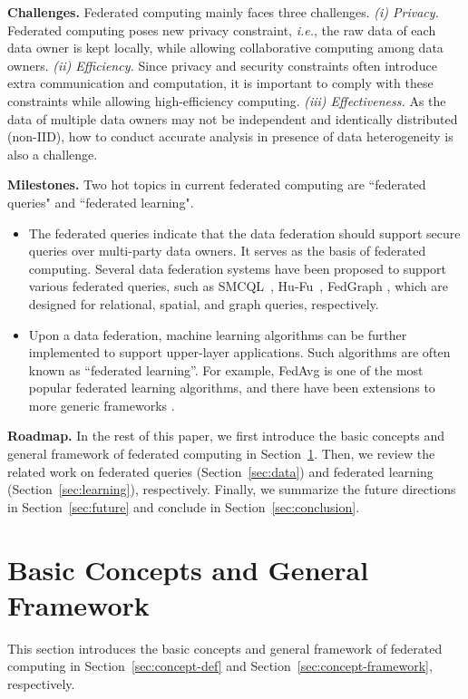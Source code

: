 \documentclass[11pt]{article}
\newcommand{\ie}{\textit{i.e.},\xspace}
\newcommand\secref[1]{Section~\ref{#1}}
\newcommand{\fakeparagraph}[1]{\vspace{1mm}\noindent\textbf{#1.}}
\begin{document}
\fakeparagraph{Challenges}
Federated computing mainly faces three challenges.
\textit{(i) Privacy.}
Federated computing poses new privacy constraint, \ie the raw data of each data owner is kept locally, while allowing collaborative computing among data owners.
\textit{(ii) Efficiency.}
Since privacy and security constraints often introduce extra communication and computation, it is important to comply with these constraints while allowing high-efficiency computing.
\textit{(iii) Effectiveness.}
As the data of multiple data owners may not be independent and identically distributed (non-IID), how to conduct accurate analysis in presence of data heterogeneity is also a challenge.

\fakeparagraph{Milestones}
Two hot topics in current federated computing are ``federated queries" and ``federated learning".
\begin{itemize}
    \item
    The federated queries indicate that the data federation should support secure queries over multi-party data owners.
    It serves as the basis of federated computing.
    Several data federation systems have been proposed to support various federated queries, such as \textsf{SMCQL}~\cite{Yongxin-ref_bater2017smcql}, \textsf{Hu-Fu}~\cite{Yongxin-ref_tong2022hu}, \textsf{FedGraph} \cite{Yongxin-DBLP:journals/pvldb/YuanMWZW21}, which are designed for relational, spatial, and graph queries, respectively.
    \item
    Upon a data federation, machine learning algorithms can be further implemented to support upper-layer applications.
    Such algorithms are often known as ``federated learning''.
    For example, \textsf{FedAvg} \cite{Yongxin-DBLP:conf/aistats/McMahanMRHA17} is one of the most popular federated learning algorithms, and there have been extensions to more generic frameworks \cite{Yongxin-DBLP:journals/tist/YangLCT19}.
\end{itemize}

\fakeparagraph{Roadmap}
In the rest of this paper, we first introduce the basic concepts and general framework of federated computing in \secref{sec:concept}.
Then, we review the related work on federated queries (\secref{sec:data}) and federated learning (\secref{sec:learning}), respectively.
Finally, we summarize the future directions in \secref{sec:future} and conclude in \secref{sec:conclusion}.

\section{Basic Concepts and General Framework}\label{sec:concept}
This section introduces the basic concepts and general framework of federated computing in \secref{sec:concept-def} and \secref{sec:concept-framework}, respectively.
\end{document}
